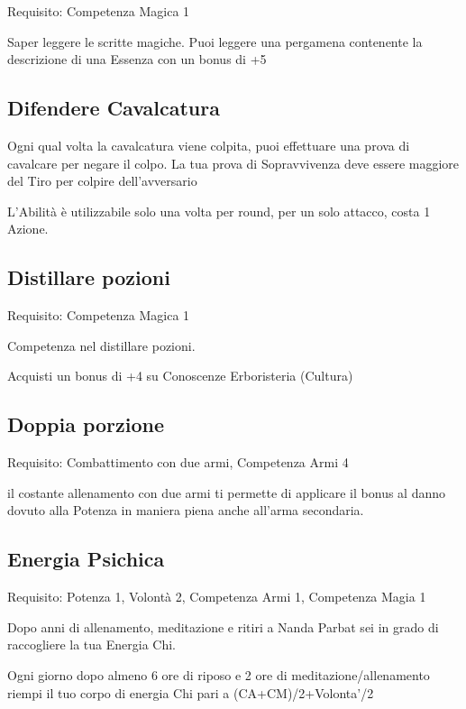 \documentclass[a4paper,11pt,twoside,openany]{book}
\begin{document}
Requisito: Competenza Magica 1

Saper leggere le scritte magiche. Puoi leggere una pergamena contenente la descrizione di una Essenza con un bonus di +5

\subsection{Difendere Cavalcatura}

Ogni qual volta la cavalcatura viene colpita, puoi effettuare una prova di cavalcare per negare il colpo. La tua prova di Sopravvivenza deve essere maggiore del Tiro per colpire dell'avversario

L'Abilità è utilizzabile solo una volta per round, per un solo attacco, costa 1 Azione.

\subsection{Distillare pozioni}

Requisito: Competenza Magica 1

Competenza nel distillare pozioni.

Acquisti un bonus di +4 su Conoscenze Erboristeria (Cultura)

\subsection{Doppia porzione}

Requisito: Combattimento con due armi, Competenza Armi 4

il costante allenamento con due armi ti permette di applicare il bonus al danno dovuto alla Potenza in maniera piena anche all'arma secondaria. 

\subsection{Energia Psichica}

Requisito: Potenza 1, Volontà 2, Competenza Armi 1, Competenza Magia 1

Dopo anni di allenamento, meditazione e ritiri a Nanda Parbat sei in grado di raccogliere la tua Energia Chi.

Ogni giorno dopo almeno 6 ore di riposo e 2 ore di meditazione/allenamento riempi il tuo corpo di energia Chi pari a (CA+CM)/2+Volonta'/2
\end{document}
